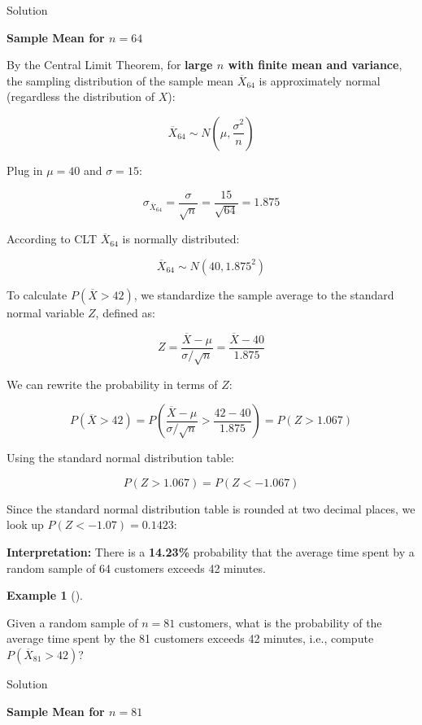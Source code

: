 \documentclass[
  12pt,
  a4paper,
]{scrbook}
\theoremstyle{plain}
\theoremstyle{definition}
\newtheorem{example}{Example}[chapter]
\theoremstyle{remark}
\begin{document}
Solution

\protect{}\label{clt2}
\textbf{Sample Mean for \(n = 64\)}

By the Central Limit Theorem, for \textbf{large \(n\) with finite mean
and variance}, the sampling distribution of the sample mean
\(\overline{X}_{64}\) is approximately normal (regardless the
distribution of \(X\)):

\[
\overline{X}_{64} \sim N (\mu, \frac{\sigma^2}{n})
\]

Plug in \(\mu = 40\) and \(\sigma = 15\):

\[
\sigma_{\overline{X}_{64}} = \frac{\sigma}{\sqrt{n}} = \frac{15}{\sqrt{64}} = 1.875
\]

According to CLT \(\overline{X}_{64}\) is normally distributed:

\[
\overline{X}_{64} \sim N\left(40, 1.875^2\right)
\]

To calculate \(P(\overline{X} > 42)\), we standardize the sample average
to the standard normal variable \(Z\), defined as:

\[
Z = \frac{\overline{X} - \mu}{\sigma/\sqrt{n}} = \frac{\overline{X} - 40}{1.875}
\]

We can rewrite the probability in terms of \(Z\):

\[
P(\overline{X} > 42) = P(\frac{\overline{X} - \mu}{\sigma/\sqrt{n}} > \frac{42 - 40}{1.875}) = P(Z > 1.067)
\]

Using the standard normal distribution table:

\[
P(Z > 1.067) = P(Z < -1.067)
\]

Since the standard normal distribution table is rounded at two decimal
places, we look up \(P(Z < -1.07) = 0.1423\):

\textbf{Interpretation:} There is a \textbf{14.23\%} probability that
the average time spent by a random sample of 64 customers exceeds 42
minutes.

\begin{example}[]\protect\hypertarget{exm-clt3}{}\label{exm-clt3}

Given a random sample of \(n=81\) customers, what is the probability of
the average time spent by the 81 customers exceeds 42 minutes, i.e.,
compute \(P(\overline{X}_{81} > 42)\)?

\end{example}

Solution

\protect{}\label{clt3}
\textbf{Sample Mean for \(n = 81\)}
\end{document}
